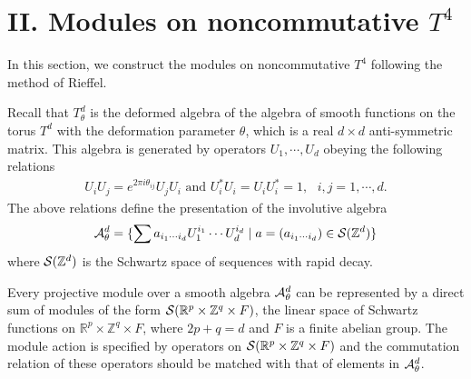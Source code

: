 \documentclass[12pt, a4paper]{article}
\newcommand{\Z}{{\mathbb Z}}
\newcommand{\R}{{\mathbb R}}
\begin{document}
\section*{II. Modules on noncommutative $T^4$ }\label{module}

In this section, we construct the modules on noncommutative $T^4$
following the method of Rieffel\cite{rief88}.

Recall that $T^d_\theta$ is the deformed algebra of the algebra of
smooth functions on the torus $T^d$ with the deformation parameter
$\theta$, which is a real $d\times d$ anti-symmetric matrix. This
algebra is generated by operators $U_1,\cdots,U_d$ obeying the
following relations
\begin{align*}
U_iU_j=e^{2\pi i \theta_{ij}}U_jU_i \text{ \ and \ }
U_i^*U_i=U_iU_i^*=1, \text{ \ \ } i,j=1,\cdots,d.
\end{align*}
The above relations define the presentation of the involutive
algebra
$${\cal A}_\theta^d=
\{\sum a_{i_1\cdots i_d}U_1^{i_1}\cdots U_d^{i_d}\mid
a=(a_{i_1\cdots i_d})\in {\cal S}({\Z}^d)\}$$ where ${\cal
S}({\Z}^d)$ is the Schwartz space of sequences with rapid decay.

Every projective module over a smooth algebra ${\cal
A}^{d}_{\theta}$ can be represented by a direct sum of modules of
the form ${\cal S}({\R}^p\times{\Z}^q\times F)$, the linear space
of Schwartz functions on ${\R}^p\times{\Z}^q\times F$, where
$2p+q=d$ and $F$ is a finite abelian group.
 The module action is specified
by operators on ${\cal S}({\R}^p\times{\Z}^q\times F)$ and the
commutation relation of these operators should be matched with
that of elements in ${\cal A}^{d}_{\theta}$.
\end{document}
